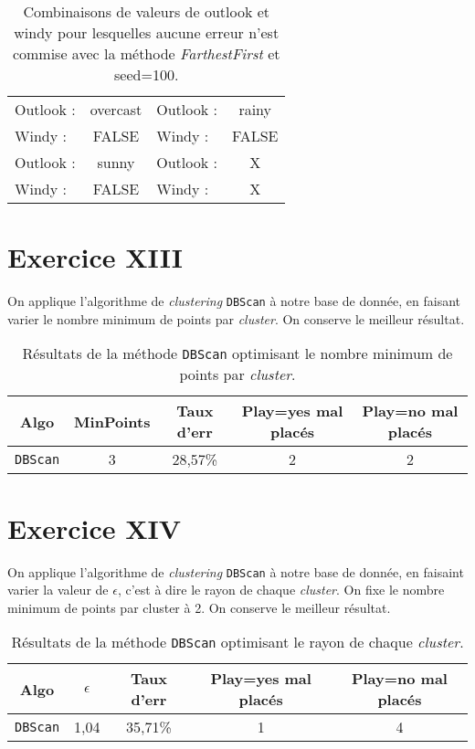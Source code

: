 \documentclass[a4paper, 11pt]{report}
\begin{document}
	\begin{table}[h!]
		\centering
		\begin{tabular}{|l|c|l|c|}
			\hline
			Outlook : & overcast  & Outlook : & rainy \\
			Windy : & FALSE & Windy : & FALSE \\
			\hline
			Outlook : & sunny & Outlook : & X \\
			Windy : & FALSE & Windy : & X \\
			\hline
		\end{tabular}
		\caption{Combinaisons de valeurs de outlook et windy pour lesquelles aucune erreur n'est commise avec la méthode \emph{FarthestFirst} et seed=100.}
		\label{tab:exo12}
	\end{table}

        \section{Exercice XIII}
        	On applique l'algorithme de \emph{clustering} \texttt{DBScan} à notre base de donnée, en faisant varier le nombre minimum de points par \emph{cluster}. On conserve le meilleur résultat.

    	\begin{table}[h!]
    		\centering
    		\begin{tabular}{|c|c|c|c|c|}
    		\hline
    		Algo & MinPoints & Taux d'err & Play=yes mal placés & Play=no mal placés \\
    		\hline
    		\texttt{DBScan} & 3 & 28,57\% & 2 & 2\\
    		\hline
    		\end{tabular}
    		\caption{Résultats de la méthode \texttt{DBScan} optimisant le nombre minimum de points par \emph{cluster}.}
        	\label{tab:exo13}
    	\end{table}

    	\section{Exercice XIV}
    		On applique l'algorithme de \emph{clustering} \texttt{DBScan} à notre base de donnée, en faisaint varier la valeur de $\epsilon$, c'est à dire le rayon de chaque \emph{cluster}. On fixe le nombre minimum de points par cluster à 2. On conserve le meilleur résultat.

		\begin{table}[h!]
			\centering
			\begin{tabular}{|c|c|c|c|c|}
				\hline
				Algo & $\epsilon$ & Taux d'err & Play=yes mal placés & Play=no mal placés \\
				\hline
				\texttt{DBScan} & 1,04 & 35,71\% & 1 & 4 \\
				\hline
			\end{tabular}
			\caption{Résultats de la méthode \texttt{DBScan} optimisant le rayon de chaque \emph{cluster}.}
        	\label{tab:exo14}
		\end{table}
\end{document}
